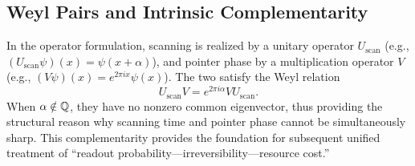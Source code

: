 \subsection{Weyl Pairs and Intrinsic Complementarity}

In the operator formulation, scanning is realized by a unitary operator $U_{\mathrm{scan}}$ (e.g., $(U_{\mathrm{scan}}\psi)(x)=\psi(x+\alpha)$), and pointer phase by a multiplication operator $V$ (e.g., $(V\psi)(x)=e^{2\pi i x}\psi(x)$). The two satisfy the Weyl relation
\[
U_{\mathrm{scan}}V=e^{2\pi i\alpha}VU_{\mathrm{scan}}.
\]
When $\alpha\notin\mathbb{Q}$, they have no nonzero common eigenvector, thus providing the structural reason why scanning time and pointer phase cannot be simultaneously sharp. This complementarity provides the foundation for subsequent unified treatment of ``readout probability---irreversibility---resource cost.''
